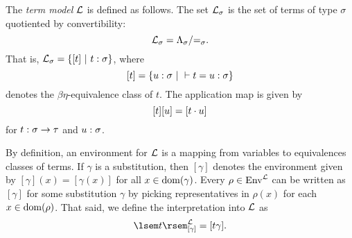 \begin{defn} \label{def:term-model}
The \emph{term model} $\tmmod$ is defined as follows. The set $\tmmod_\sigma$ is the set of terms of type $\sigma$ quotiented by convertibility:
\[ \tmmod_\sigma = \Tm[\sigma] / \convrel{\sigma}. \]
That is, $\tmmod_\sigma = \setof{[t]}{\typedtm{t}{\sigma}}$,
where
\[ [t] = \setof{\typedtm{u}{\sigma}}{\conv{t}{u}{\sigma}} \]
denotes the $\beta\eta$-equivalence class of $t$. The application map is given by
\[ [t] [u] = [\app{t}{u}] \]
for $\typedtm{t}{\functy{\sigma}{\tau}}$ and $\typedtm{u}{\sigma}$.

By definition, an environment for $\tmmod$ is a mapping from variables to equivalences classes of terms. If $\gamma$ is a substitution, then $[\gamma]$ denotes the environment given by $[\gamma](x) = [\gamma(x)]$ for all $x \in \dom{\gamma}$. Every $\rho \in \Env[][\tmmod]$ can be written as $[\gamma]$ for some substitution $\gamma$ by picking representatives in $\rho(x)$ for each $x \in \dom{\rho}$. That said, we define the interpretation into $\tmmod$ as
\[ \sint[\tmmod]{t}{[\gamma]} = [\subst{t}{\gamma}]. \]
\end{defn}


